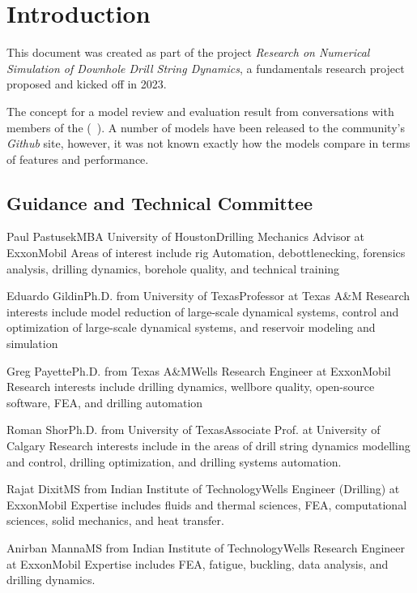 \chapter{Introduction}
This document was created as part of the project \emph{Research on Numerical Simulation of Downhole Drill String Dynamics}, a fundamentals research project proposed and kicked off in 2023.

The concept for a model review and evaluation result from conversations with members of the \osdc{} (~\cite{ref:pastusek2019a}).  A number of models have been released to the community's \emph{Github} site, however, it was not known exactly how the models compare in terms of features and performance.

\section{Guidance and Technical Committee}

\begin{committeemember}{Paul Pastusek}{MBA University of Houston}{Drilling Mechanics Advisor at ExxonMobil}
Areas of interest include rig Automation, debottlenecking, forensics analysis, drilling dynamics, borehole quality, and technical training
\end{committeemember}


\begin{committeemember}{Eduardo Gildin}{Ph.D. from University of Texas}{Professor at Texas A\&M}
Research interests include model reduction of large-scale dynamical systems, control and optimization of large-scale dynamical systems, and reservoir modeling and simulation
\end{committeemember}


\begin{committeemember}{Greg Payette}{Ph.D. from Texas A\&M}{Wells Research Engineer at ExxonMobil}
Research interests include drilling dynamics, wellbore quality, open-source software, FEA, and drilling automation
\end{committeemember}

\begin{committeemember}{Roman Shor}{Ph.D. from University of Texas}{Associate Prof. at University of Calgary}
Research interests include in the areas of drill string dynamics modelling and control, drilling optimization, and drilling systems automation.
\end{committeemember}

\begin{committeemember}{Rajat Dixit}{MS from Indian Institute of Technology}{Wells Engineer (Drilling) at ExxonMobil}
Expertise includes fluids and thermal sciences, FEA, computational sciences, solid mechanics, and heat transfer.
\end{committeemember}



\begin{committeemember}{Anirban Manna}{MS from Indian Institute of Technology}{Wells Research Engineer at ExxonMobil}
Expertise includes FEA, fatigue, buckling, data analysis, and drilling dynamics.
\end{committeemember}